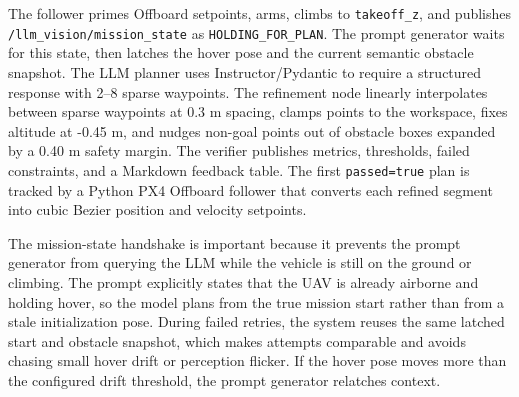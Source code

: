 \documentclass[12pt]{article}
\begin{document}
\begin{center}
\end{center}

The follower primes Offboard setpoints, arms, climbs to \texttt{takeoff\_z}, and publishes \texttt{/llm\_vision/mission\_state} as \texttt{HOLDING\_FOR\_PLAN}. The prompt generator waits for this state, then latches the hover pose and the current semantic obstacle snapshot. The LLM planner uses Instructor/Pydantic to require a structured response with 2--8 sparse waypoints. The refinement node linearly interpolates between sparse waypoints at 0.3 m spacing, clamps points to the workspace, fixes altitude at -0.45 m, and nudges non-goal points out of obstacle boxes expanded by a 0.40 m safety margin. The verifier publishes metrics, thresholds, failed constraints, and a Markdown feedback table. The first \texttt{passed=true} plan is tracked by a Python PX4 Offboard follower that converts each refined segment into cubic Bezier position and velocity setpoints.

The mission-state handshake is important because it prevents the prompt generator from querying the LLM while the vehicle is still on the ground or climbing. The prompt explicitly states that the UAV is already airborne and holding hover, so the model plans from the true mission start rather than from a stale initialization pose. During failed retries, the system reuses the same latched start and obstacle snapshot, which makes attempts comparable and avoids chasing small hover drift or perception flicker. If the hover pose moves more than the configured drift threshold, the prompt generator relatches context.
\end{document}
